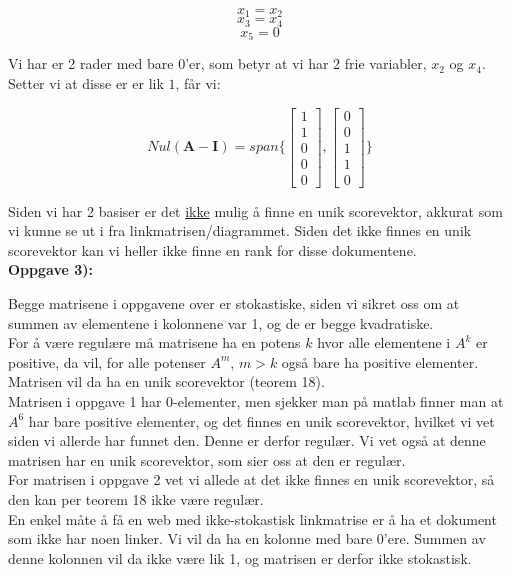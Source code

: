 \documentclass[a4paper,norsk,11pt,twoside]{article}
\begin{document}
$$
x_1 = x_2
$$
$$
x_3 = x_4
$$
$$
x_5 = 0
$$

Vi har er 2 rader med bare 0'er, som betyr at vi har 2 frie variabler, $x_2$ og $x_4$. Setter vi at disse er er lik $1$, får vi:

$$
Nul(\textbf{A} -\textbf{I}) = span\{ \begin{bmatrix}
1 \\ 1 \\ 0 \\ 0 \\ 0
\end{bmatrix},
\begin{bmatrix}
0 \\ 0 \\ 1 \\ 1 \\ 0
\end{bmatrix} \}
$$

Siden vi har 2 basiser er det \underline{ikke} mulig å finne en unik scorevektor, akkurat som vi kunne se ut i fra linkmatrisen/diagrammet. Siden det ikke finnes en unik scorevektor kan vi heller ikke finne en rank for disse dokumentene.\\



\textbf{Oppgave 3):}

Begge matrisene i oppgavene over er stokastiske, siden vi sikret oss om at summen av elementene i kolonnene var 1, og de er begge kvadratiske.\\

For å være regulære må matrisene ha en potens $k$ hvor alle elementene i $A^{k}$ er positive, da vil, for alle potenser $A^{m}$, $m>k$ også bare ha positive elementer. Matrisen vil da ha en unik scorevektor (teorem 18).\\

Matrisen i oppgave 1 har 0-elementer, men sjekker man på matlab finner man at $A^{6}$ har bare positive elementer, og det finnes en unik scorevektor, hvilket vi vet siden vi allerde har funnet den. Denne er derfor regulær. Vi vet også at denne matrisen har en unik scorevektor, som sier oss at den er regulær.\\

For matrisen i oppgave 2 vet vi allede at det ikke finnes en unik scorevektor, så den kan per teorem 18 ikke være regulær.\\

En enkel måte å få en web med ikke-stokastisk linkmatrise er å ha et dokument som ikke har noen linker. Vi vil da ha en kolonne med bare 0'ere. Summen av denne kolonnen vil da ikke være lik 1, og matrisen er derfor ikke stokastisk.\\
\end{document}
